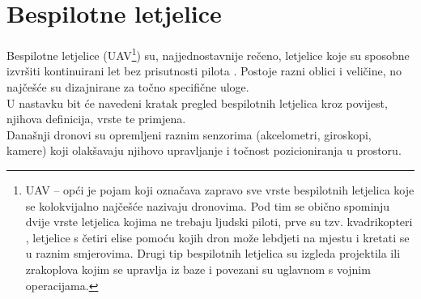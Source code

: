 \documentclass[times, utf8, diplomski]{fer}
\begin{document}
\section{Bespilotne letjelice}
Bespilotne letjelice (UAV\footnote{UAV  – opći je pojam koji označava zapravo sve vrste bespilotnih letjelica koje se kolokvijalno najčešće nazivaju dronovima. Pod tim se obično spominju dvije vrste letjelica kojima ne trebaju ljudski piloti, prve su tzv. kvadrikopteri , letjelice s četiri elise pomoću kojih dron može lebdjeti na mjestu i kretati se u raznim smjerovima. Drugi tip bespilotnih letjelica su izgleda projektila ili zrakoplova kojim se upravlja iz baze i povezani su uglavnom s vojnim operacijama.}) su, najjednostavnije rečeno, letjelice koje su sposobne izvršiti kontinuirani let bez prisutnosti pilota \citep{UAV}. Postoje razni oblici i veličine, no najčešće su dizajnirane za točno specifične uloge.\\
U nastavku bit će navedeni kratak pregled bespilotnih letjelica kroz povijest, njihova definicija, vrste te primjena.\\
Današnji dronovi su opremljeni raznim senzorima (akcelometri, giroskopi, kamere) koji olakšavaju njihovo upravljanje i točnost pozicioniranja u prostoru.
\end{document}
